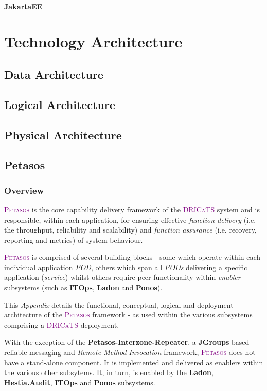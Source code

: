 \documentclass[a4paper]{book}
\newcommand{\dricats}{\textsc{\textcolor{Purple}{\small{DRICaTS }}}}
\newcommand{\petasos}{\textsc{\textcolor{Purple}{\small{Petasos }}}}
\begin{document}
\subsection{JakartaEE\texttrademark}

\part{Technology Architecture}
\chapter{Data Architecture}

\chapter{Logical Architecture}

\chapter{Physical Architecture}

\appendix

\chapter{Petasos}
\label{epic:petasos}
\section{Overview}
    \petasos is the core capability delivery framework of the \dricats system and is responsible, within each application, for ensuring effective \textit{function delivery} (i.e. the throughput, reliability and scalability) and \textit{function assurance} (i.e. recovery, reporting and metrics) of system behaviour.

    \petasos is comprised of several building blocks - some which operate within each individual application \textit{POD}, others which span all \textit{PODs} delivering a specific application (\textit{service}) whilst others require peer functionality within \textit{enabler} subsystems (such as \textbf{ITOps}, \textbf{Ladon} and \textbf{Ponos}).

    This \textit{Appendix} details the functional, conceptual, logical and deployment architecture of the \petasos framework - as used within the various subsystems comprising a \dricats deployment.

    With the exception of the \textbf{Petasos-Interzone-Repeater}, a \textbf{JGroups} based reliable messaging and \textit{Remote Method Invocation} framework, \petasos does not have a stand-alone component. It is implemented and delivered as enablers within the various other subsytems. It, in turn, is enabled by the \textbf{Ladon}, \textbf{Hestia.Audit}, \textbf{ITOps} and \textbf{Ponos} subsystems.
\end{document}
